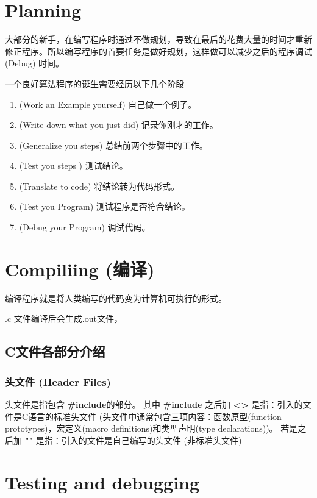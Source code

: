 \section{Planning}
大部分的新手，在编写程序时通过不做规划，导致在最后的花费大量的时间才重新修正程序。所以编写程序的首要任务是做好规划，这样做可以减少之后的程序调试 (Debug) 时间。

一个良好算法程序的诞生需要经历以下几个阶段
\begin{enumerate}
	\item (Work an Example yourself) 自己做一个例子。
	\item (Write down what you just did) 记录你刚才的工作。
	\item (Generalize you steps) 总结前两个步骤中的工作。
	\item (Test you steps ) 测试结论。
	\item (Translate to code) 将结论转为代码形式。
	\item (Test you Program) 测试程序是否符合结论。
	\item (Debug your Program) 调试代码。

\end{enumerate}

\section{Compiliing (编译)}
编译程序就是将人类编写的代码变为计算机可执行的形式。

.c 文件编译后会生成.out文件，


\begin{figure}
	\centering
	\label{fig:compileCFile}
	
\end{figure}

\subsection{C文件各部分介绍}
\subsubsection{头文件 (Header Files)}
头文件是指包含 \textbf{#include}的部分。
其中 \textbf{#include} 之后加 \textbf{<>} 是指：引入的文件是C语言的标准头文件 (头文件中通常包含三项内容：函数原型(function prototypes)，宏定义(macro definitions)和类型声明(type declarations))。
若是之后加 \textbf{""} 是指：引入的文件是自己编写的头文件 (非标准头文件)







\section{Testing and debugging}

\section{}
